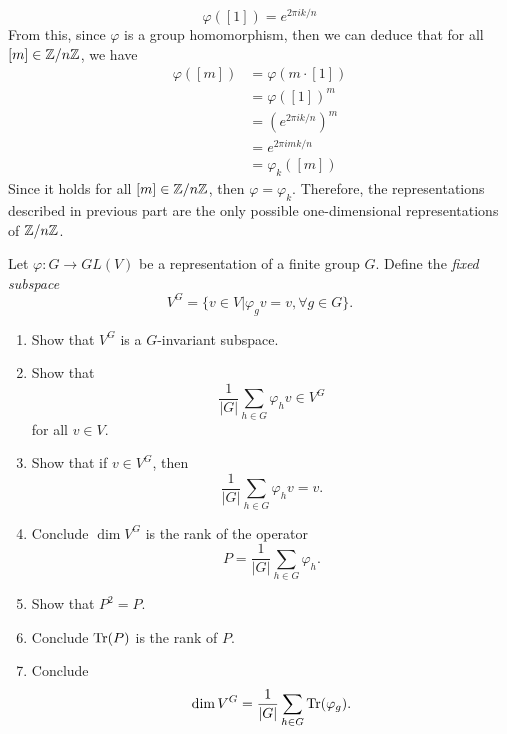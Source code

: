 \begin{solution}
\begin{enumerate}
        $$\varphi([1]) = e^{2\pi i k / n}$$
        From this, since $\varphi$ is a group homomorphism, then we can deduce that for all $[m] \in \mathbb{Z}/n\mathbb{Z}$, we have
        \begin{align*}
            \varphi([m]) &= \varphi(m \cdot [1]) \\
            &= \varphi([1])^m \\
            &= (e^{2\pi i k / n})^m \\
            &= e^{2\pi i m k / n} \\
            &= \varphi_k([m])
        \end{align*}
        Since it holds for all $[m] \in \mathbb{Z}/n\mathbb{Z}$, then $\varphi = \varphi_k$. Therefore, the representations described in previous part are the only possible one-dimensional representations of $\mathbb{Z}/n\mathbb{Z}$. \\
    \end{enumerate}
\end{solution}

\begin{exercise}
    Let $\varphi : G \to GL(V)$ be a representation of a finite group $G$. Define the \textit{fixed subspace}
    $$V^G = \{v \in V | \varphi_g v = v , \forall g \in G\}.$$
    \begin{enumerate}
        \item Show that $V^G$ is a $G$-invariant subspace.
        \item Show that
        $$\frac{1}{|G|}\sum_{h \in G}\varphi_h v \in V^G$$
        for all $v \in V$.
        \item Show that if $v \in V^G$, then
        $$\frac{1}{|G|}\sum_{h \in G}\varphi_h v = v.$$
        \item Conclude $\dim V^G$ is the rank of the operator
        $$P = \frac{1}{|G|}\sum_{h \in G}\varphi_h.$$
        \item Show that $P^2 = P$.
        \item Conclude $\text{Tr}(P)$ is the rank of $P$.
        \item Conclude
        $$\dim V^G = \frac{1}{|G|}\sum_{h \in G} \text{Tr}(\varphi_g).$$ \\
    \end{enumerate}
\end{exercise}

